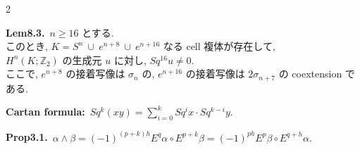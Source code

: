 \documentclass[10pt, leqno]{ltjsarticle}
\newcommand{\z}{\mathbb{Z}}
\newcommand{\sq}[1]{Sq^{#1}}
\numberwithin{equation}{section}
\theoremstyle{plain}
\theoremstyle{definition}
\theoremstyle{remark}
\begin{document}
\begin{paracol}{2}
\switchcolumn

\noindent
\textbf{Lem8.3.}\
$n\ge16$ とする. \\
このとき,
\(
K=S^n\ \cup\ e^{n+8}\ \cup\ e^{n+16}
\)
なる \textnormal{cell} 複体が存在して, \\
$H^n(K;\z_2)$ の生成元 $u$ に対し,
\(
Sq^{16}u\ne0.
\)\\
ここで, 
\(e^{n+8}\) の接着写像は \(\sigma_n\) の,
\(e^{n+16}\) の接着写像は \(2\sigma_{n+7}\) の \textnormal{coextension} である.

\noindent
\textbf{Cartan formula:}\ 
\(\sq{k}(x y) = \sum_{i=0}^{k}\sq{i}x\cdot \sq{k-i}y.\)

\noindent
\textbf{Prop3.1.}\
\(
\alpha \wedge \beta
= (-1)^{(p+k)h} E^{q}\alpha \circ E^{p+k}\beta
= (-1)^{ph} E^{p}\beta \circ E^{q+h}\alpha .
\)



\end{paracol}
\end{document}

